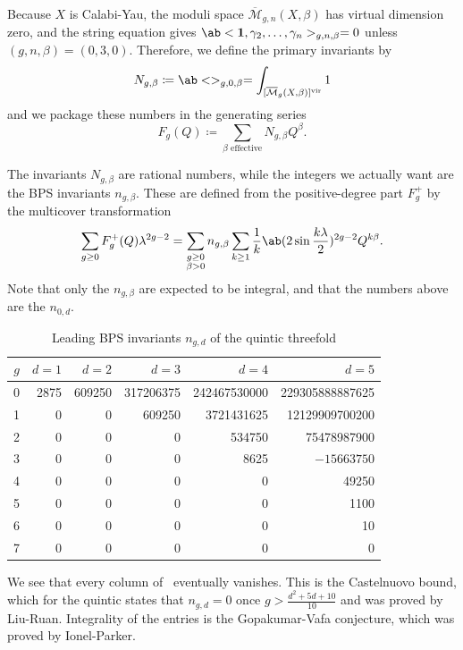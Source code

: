 \documentclass{amsart}
\theoremstyle{definition}
\theoremstyle{remark}
\theoremstyle{plain}
\theoremstyle{definition}
\theoremstyle{remark}
\newcommand{\Mbar}{\overline{\mathcal{M}}}
\newcommand{\mr}[1]{\mathrm{#1}}
\newcommand{\1}{\mathbf{1}}
\newcommand{\2}{\mathbf{2}}
\newcommand{\3}{\mathbf{3}}
\newcommand{\vir}{\mr{vir}}
\begin{document}
Because \(X\) is Calabi-Yau, the moduli space \(\Mbar_{g,n}(X,\beta)\) has virtual dimension zero, and the string equation gives \(\ab<\1, \gamma_2, \ldots, \gamma_n>_{g,n,\beta} = 0\) unless \((g,n,\beta) = (0,3,0)\). Therefore, we define the primary invariants by
\[ N_{g,\beta} \coloneqq \ab<>_{g,0,\beta} = \int_{[\Mbar_g(X,\beta)]^{\vir}} 1 \]
and we package these numbers in the generating series
\[ F_g(Q) \coloneqq \sum_{\beta \text{ effective}} N_{g,\beta}Q^{\beta}. \]

The invariants \(N_{g,\beta}\) are rational numbers, while the integers we actually want are the BPS invariants \(n_{g,\beta}\). These are defined from the positive-degree part \(F_g^+\) by the multicover transformation
\[ \sum_{g \geq 0} F_g^+(Q)\lambda^{2g-2} = \sum_{\substack{g \geq 0 \\ \beta > 0}} n_{g,\beta} \sum_{k \geq 1} \frac{1}{k} \ab(2 \sin \frac{k\lambda}{2})^{2g-2}Q^{k\beta}. \]
Note that only the \(n_{g,\beta}\) are expected to be integral, and that the numbers above are the \(n_{0,d}\).

\begin{table}[htpb]
    \centering
    \caption{Leading BPS invariants \(n_{g,d}\) of the quintic threefold}
    \label{tab:quinticbps}
    \begin{tabular}{crrrrr}
        \toprule
        \(g\) & \(d=1\) & \(d=2\) & \(d=3\) & \(d=4\) & \(d=5\) \\
        \midrule
        0 & 2875 & 609250 & 317206375 & 242467530000 & 229305888887625 \\
        1 & 0 & 0 & 609250 & 3721431625 & 12129909700200 \\
        2 & 0 & 0 & 0 & 534750 & 75478987900 \\
        3 & 0 & 0 & 0 & 8625 & \(-15663750\) \\
        4 & 0 & 0 & 0 & 0 & 49250 \\
        5 & 0 & 0 & 0 & 0 & 1100 \\
        6 & 0 & 0 & 0 & 0 & 10 \\
        7 & 0 & 0 & 0 & 0 & 0 \\
        \bottomrule
    \end{tabular}
\end{table}

We see that every column of~ eventually vanishes. This is the Castelnuovo bound, which for the quintic states that \(n_{g,d} = 0\) once \(g > \frac{d^2+5d+10}{10}\) and was proved by Liu-Ruan. Integrality of the entries is the Gopakumar-Vafa conjecture, which was proved by Ionel-Parker.
\end{document}
